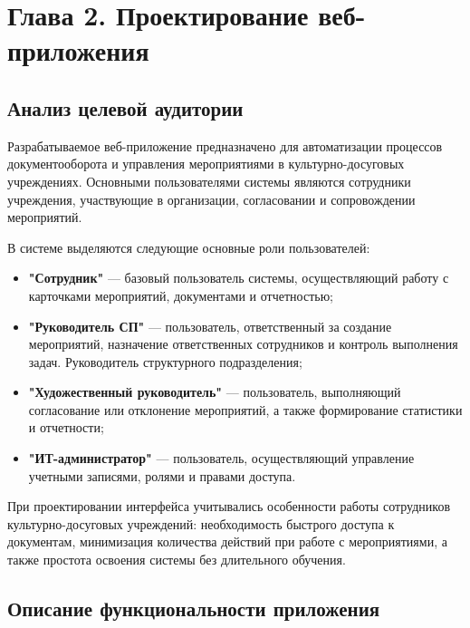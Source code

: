 \section*{Глава 2. Проектирование веб-приложения}

\subsection{Анализ целевой аудитории}

Разрабатываемое веб-приложение предназначено для автоматизации процессов
документооборота и управления мероприятиями в культурно-досуговых
учреждениях. Основными пользователями системы являются сотрудники
учреждения, участвующие в организации, согласовании и сопровождении
мероприятий.

В системе выделяются следующие основные роли пользователей:

\begin{itemize}
	\item \textbf{"Сотрудник"} --- базовый пользователь системы, осуществляющий
	      работу с карточками мероприятий, документами и отчетностью;

	\item \textbf{"Руководитель СП"} --- пользователь, ответственный за создание
	      мероприятий, назначение ответственных сотрудников и контроль
	      выполнения задач. Руководитель структурного подразделения;

	\item \textbf{"Художественный руководитель"} --- пользователь, выполняющий
	      согласование или отклонение мероприятий, а также формирование
	      статистики и отчетности;

	\item \textbf{"ИТ-администратор"} --- пользователь, осуществляющий управление
	      учетными записями, ролями и правами доступа.
\end{itemize}

При проектировании интерфейса учитывались особенности работы сотрудников
культурно-досуговых учреждений: необходимость быстрого доступа к
документам, минимизация количества действий при работе с мероприятиями,
а также простота освоения системы без длительного обучения.

\newpage
\subsection{Описание функциональности приложения}


